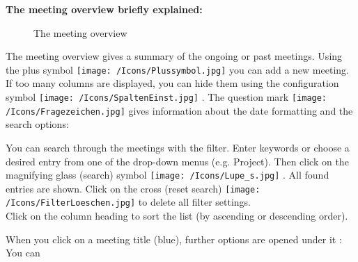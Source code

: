 \vspace{5cm}

\pagebreak
\textbf{The meeting overview briefly explained:}

\begin{figure}[H]
\caption{The meeting overview}
\end{figure}

The meeting overview gives a summary of the ongoing or past meetings. Using the plus symbol \texttt{[image: /Icons/Plussymbol.jpg]}  you can add a new meeting. If too many columns are displayed, you can hide them using the configuration symbol \texttt{[image: /Icons/SpaltenEinst.jpg]} . The question mark \texttt{[image: /Icons/Fragezeichen.jpg]}  gives information about the date formatting and the search options: 

\begin{figure}[H]
\end{figure}

You can search through the meetings with the filter. Enter keywords or choose a desired entry from one of the drop-down menus (e.g. Project). Then click on the magnifying glass (search) symbol \texttt{[image: /Icons/Lupe\_s.jpg]} . All found entries are shown. Click on the cross (reset search) \texttt{[image: /Icons/FilterLoeschen.jpg]}  to delete all filter settings. \\
Click on the column heading to sort the list (by ascending or descending order).

When you click on a meeting title (blue), further options are opened under it : You can

